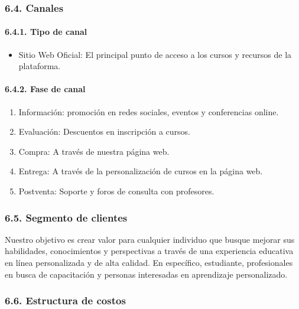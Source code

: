 \documentclass[
]{article}
\providecommand{\tightlist}{%
  \setlength{\itemsep}{0pt}\setlength{\parskip}{0pt}}
\begin{document}
\subsubsection{6.4. Canales}\label{canales}

\paragraph{6.4.1. Tipo de canal}\label{tipo-de-canal}

\begin{itemize}
\tightlist
\item
  Sitio Web Oficial: El principal punto de acceso a los cursos y
  recursos de la plataforma.
\end{itemize}

\paragraph{6.4.2. Fase de canal}\label{fase-de-canal}

\begin{enumerate}
\def\labelenumi{\arabic{enumi}.}
\tightlist
\item
  Información: promoción en redes sociales, eventos y conferencias
  online.
\item
  Evaluación: Descuentos en inscripción a cursos.
\item
  Compra: A través de nuestra página web.
\item
  Entrega: A través de la personalización de cursos en la página web.
\item
  Postventa: Soporte y foros de consulta con profesores.
\end{enumerate}

\subsubsection{6.5. Segmento de clientes}\label{segmento-de-clientes}

Nuestro objetivo es crear valor para cualquier individuo que busque
mejorar sus habilidades, conocimientos y perspectivas a través de una
experiencia educativa en línea personalizada y de alta calidad. En
específico, estudiante, profesionales en busca de capacitación y
personas interesadas en aprendizaje personalizado.

\subsubsection{6.6. Estructura de costos}\label{estructura-de-costos}
\end{document}
